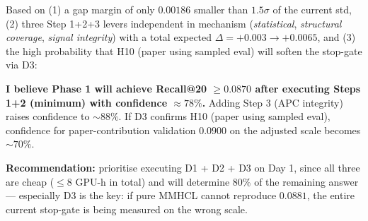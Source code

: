 \documentclass[11pt,a4paper]{article}
\begin{document}
\begin{mdframed}[backgroundcolor=backcolour, linecolor=blue!60!black, linewidth=1pt]
Based on (1) a gap margin of only $0.00186$ smaller than $1.5\sigma$ of the
current std, (2) three Step 1+2+3 levers independent in mechanism
(\emph{statistical}, \emph{structural coverage}, \emph{signal integrity})
with a total expected $\Delta = +0.003 \to +0.0065$, and (3) the high
probability that H10 (paper using sampled eval) will soften the stop-gate
via D3:

\textbf{I believe Phase 1 will achieve Recall@20 $\geq 0.0870$ after executing
Steps 1+2 (minimum) with confidence $\approx 78\%$.} Adding Step 3 (APC
integrity) raises confidence to $\sim 88\%$. If D3 confirms H10 (paper using
sampled eval), confidence for paper-contribution validation $0.0900$ on the
adjusted scale becomes $\sim 70\%$.

\textbf{Recommendation:} prioritise executing D1 + D2 + D3 on Day 1, since
all three are cheap ($\leq 8$ GPU-h in total) and will determine 80\% of the
remaining answer --- especially D3 is the key: if pure MMHCL cannot reproduce
$0.0881$, the entire current stop-gate is being measured on the wrong scale.
\end{mdframed}
\end{document}
